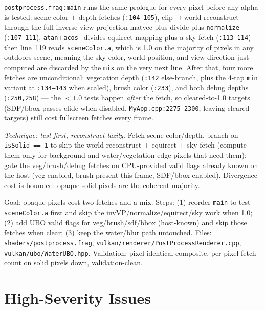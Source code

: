 \documentclass[11pt,a4paper]{article}
\begin{document}
\texttt{postprocess.frag:main} runs the same prologue for every pixel
before any alpha is tested: scene color + depth fetches (\texttt{:104--105}),
clip$\rightarrow$world reconstruct through the full inverse view-projection
matvec plus divide plus \texttt{normalize} (\texttt{:107--111}),
\texttt{atan}+\texttt{acos}+divides equirect mapping plus a sky fetch
(\texttt{:113--114}) --- then line~119 reads \texttt{sceneColor.a}, which is
1.0 on the majority of pixels in any outdoors scene, meaning the sky color,
world position, and view direction just computed are discarded by the
\texttt{mix} on the very next line. After that, four more fetches are
unconditional: vegetation depth (\texttt{:142} else-branch, plus the 4-tap
\texttt{min} variant at \texttt{:134--143} when scaled), brush color
(\texttt{:233}), and both debug depths (\texttt{:250,258}) --- the
\texttt{$< 1.0$} tests happen \emph{after} the fetch, so cleared-to-1.0
targets (SDF/bbox passes elide when disabled, \texttt{MyApp.cpp:2275--2300},
leaving cleared targets) still cost fullscreen fetches every frame.

\textit{Technique: test first, reconstruct lazily.} Fetch scene color/depth,
branch on \texttt{isSolid == 1} to skip the world reconstruct + equirect +
sky fetch (compute them only for background and water/vegetation edge
pixels that need them); gate the veg/brush/debug fetches on CPU-provided
valid flags already known on the host (veg enabled, brush present this
frame, SDF/bbox enabled). Divergence cost is bounded: opaque-solid pixels
are the coherent majority.

\begin{tcolorbox}[promptbox={Prompt --- C3: lazy composite prologue}]
Goal: opaque pixels cost two fetches and a mix. Steps: (1) reorder
\texttt{main} to test \texttt{sceneColor.a} first and skip the
invVP/normalize/equirect/sky work when 1.0; (2) add UBO valid flags for
veg/brush/sdf/bbox (host-known) and skip those fetches when clear;
(3) keep the water/blur path untouched. Files:
\texttt{shaders/postprocess.frag},
\texttt{vulkan/renderer/PostProcessRenderer.cpp},
\texttt{vulkan/ubo/WaterUBO.hpp}. Validation: pixel-identical composite,
per-pixel fetch count on solid pixels down, validation-clean.
\end{tcolorbox}

\section{High-Severity Issues}
\end{document}
